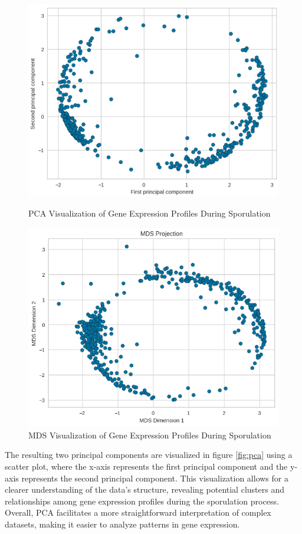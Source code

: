 \documentclass{article}
\begin{document}
\begin{figure}[H]
	\centering
	\begin{minipage}{0.45\textwidth}
		\centering
		\includegraphics[width=\textwidth]{images/pca.png}
		\caption{PCA Visualization of Gene Expression Profiles During Sporulation}
		\label{fig:pca}
	\end{minipage}\hfill
	\begin{minipage}{0.45\textwidth}
		\centering
		\includegraphics[width=\textwidth]{images/mds.png}
		\caption{MDS Visualization of Gene Expression Profiles During Sporulation}
		\label{fig:mds}
	\end{minipage}
\end{figure}
The resulting two principal components are visualized in figure \ref{fig:pca} using a scatter plot, where the x-axis represents the first principal component and the y-axis represents the second principal component. This visualization allows for a clearer understanding of the data's structure, revealing potential clusters and relationships among gene expression profiles during the sporulation process. Overall, PCA facilitates a more straightforward interpretation of complex datasets, making it easier to analyze patterns in gene expression.
\\
\end{document}
